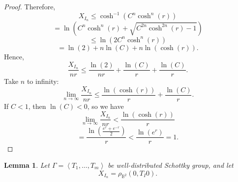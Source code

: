 \documentclass[12pt,oneside]{sfsuthesis}
\theoremstyle{plain} %
\newtheorem{lemma}[theorem]{Lemma}
\theoremstyle{definition}  %
\theoremstyle{remark}  %
\theoremstyle{plain}
\begin{document}
{\begin{proof}
Therefore, 
$$
X_{I_{n}}\leq \cosh^{-1}\left(C^n\cosh^n\left(r\right) \right)
$$
$$
=\ln\left(C^n\cosh^n\left(r\right)+\sqrt{C^{2n}\cosh^{2n}\left( r\right)-1} \right)
$$
$$
\leq \ln\left(2C^n\cosh^n\left( r\right) \right)
$$
$$
=\ln\left(2\right)+n\ln\left(C\right)+n\ln\left(\cosh\left(r\right)\right).
$$
Hence, 
$$
\frac{X_{I_n}}{nr}\leq \frac{\ln\left(2\right)}{nr}+\frac{\ln\left(C\right)}{r}+\frac{\ln\left(C\right)}{r}.
$$
Take $n$ to infinity:
$$
\lim\limits_{n\to\infty}\frac{X_{I_{n}}}{nr}\leq \frac{\ln\left(\cosh\left(r\right)\right)}{r}+\frac{\ln\left(C\right)}{r}.
$$
If $C<1$, then $\ln\left(C\right)<0$, so we have
$$
\lim\limits_{n\to\infty}\frac{X_{I_{n}}}{nr}<\frac{\ln\left(\cosh\left(r\right)\right)}{r}
$$
$$
=\frac{\ln\left(\frac{e^r+e^{-r}}{2}\right)}{r}<\frac{\ln\left(e^r\right)}{r}=1.
$$
\end{proof}
\begin{lemma}


Let $\Gamma=\left\langle T_1,\dots,T_m \right\rangle$ be well-distributed Schottky group, and let $$X_{I_n}=\rho_{\mathbb{B}^2}\left(0,T_I0 \right).$$ 


\end{lemma}}
\end{document}
